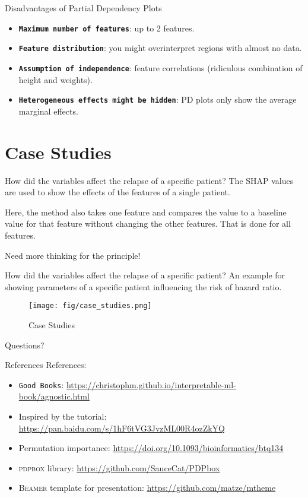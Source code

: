 \documentclass[10pt]{beamer}
\begin{document}
\begin{frame}[fragile]{Disadvantages of Partial Dependency Plots}
  \begin{itemize}
    \item \textbf{\texttt{Maximum number of features}}: up to 2 features.
    \item \textbf{\texttt{Feature distribution}}: you might overinterpret regions with almost no data.
    \item \textbf{\texttt{Assumption of independence}}: feature correlations (ridiculous combination of height and weights).
    \item \textbf{\texttt{Heterogeneous effects might be hidden}}: PD plots only show the average marginal effects.
  \end{itemize}
\end{frame}

\section{Case Studies}

\begin{frame}{How did the variables affect the relapse of a specific patient?}
  The \textsc{SHAP} values are used to show the effects of the features of a single patient.

  Here, the method also takes one feature and compares the value to a baseline value for that feature without changing the other features. That is done for all features.

  \alert{Need more thinking for the principle!}
\end{frame}

\begin{frame}{How did the variables affect the relapse of a specific patient?}
  An example for showing parameters of a specific patient influencing the risk of hazard ratio.
  \begin{figure}[htbp]
    \centering
    \texttt{[image: fig/case\_studies.png]}
    \caption{Case Studies}
  \end{figure}
\end{frame}

\begin{frame}[standout]
  Questions?
\end{frame}

\begin{frame}{References}
  References:
  \begin{itemize}
    \item \texttt{Good Books}: \url{https://christophm.github.io/interpretable-ml-book/agnostic.html} 
    \item Inspired by the tutorial: \url{https://pan.baidu.com/s/1hF6tVG3JvzML00R4ozZkYQ}
    \item Permutation importance: \url{https://doi.org/10.1093/bioinformatics/btq134}
    \item \textsc{pdpbox} library: \url{https://github.com/SauceCat/PDPbox}
    \item \textsc{Beamer} template for presentation: \url{https://github.com/matze/mtheme}
  \end{itemize}
\end{frame}
\end{document}
